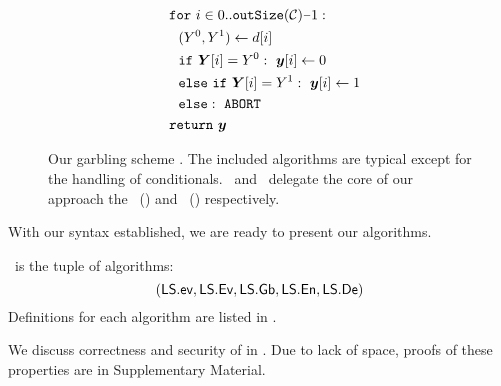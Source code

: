 \begin{figure}
\begin{adjustwidth}{-0.1\textwidth}{-0.1\textwidth}
\begin{minipage}[t]{0.40\linewidth}
\begin{align*}
      &~~\cfor~i \in 0.. \outsize(\cir)\minus 1:\\
      &~~~~(Y^0, Y^1) \gets d[i]\\
      &~~~~\cif~\gcirout[i] = Y^0:~\cirout[i] \gets 0\\
      &~~~~\celse~\cif~\gcirout[i] = Y^1:~\cirout[i] \gets 1\\
      &~~~~\celse:~\mathtt{ABORT}\\
      &~~\creturn~\cirout
    \end{align*}
  \end{minipage}
  \end{adjustwidth}
  \caption{%
    Our garbling scheme \ourschemelong.
    The included algorithms are typical except for the handling of
    conditionals.
    \gEv\ and \gGb\ delegate the core of our approach the \evcond\
    () and
    \gbcond\ () respectively.
  }\label{fig:scheme}
\end{figure}


With our syntax established, we are ready to present our algorithms.
\begin{construction}[\ourschemelong]\label{ourconstr}
  \ourschemelong\ is the tuple of algorithms:
  \[ (\textsf{LS}.\textsf{ev}, \textsf{LS}.\textsf{Ev}, \textsf{LS}.\textsf{Gb}, \textsf{LS}.\textsf{En}, \textsf{LS}.\textsf{De}) \]
  Definitions for each algorithm are listed in \Cref{fig:scheme}.
\end{construction}

We discuss correctness and security of  in
. Due to lack of space, proofs of these properties are
in Supplementary Material.

